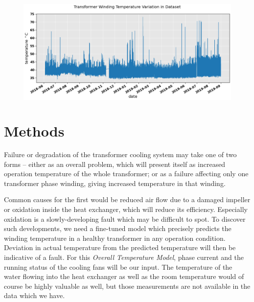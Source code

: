 \documentclass[]{article}
\begin{document}
\begin{figure}[!h]
	\centering
	\includegraphics[width=1\linewidth]{./figs/winding-temp-all-dataset.png}
	\caption{}
	\label{fig:winding-temp-all-dataset}
\end{figure}



\section{Methods} \label{sec:methods}

Failure or degradation of the transformer cooling system may take one of two forms -- either as an overall problem, which will present itself as increased operation temperature of the whole transformer; or as a failure affecting only one transformer phase winding, giving increased temperature in that winding. 

Common causes for the first would be reduced air flow due to a damaged impeller or oxidation inside the heat exchanger, which will reduce its efficiency. Especially oxidation is a slowly-developing fault which may be difficult to spot. To discover such developments, we need a fine-tuned model which precisely predicts the winding temperature in a healthy transformer in any operation condition. Deviation in actual temperature from the predicted temperature will then be indicative of a fault. For this \textit{Overall Temperature Model}, phase current and the running status of the cooling fans will be our input. The temperature of the water flowing into the heat exchanger as well as the room temperature would of course be highly valuable as well, but those measurements are not available in the data which we have.
\end{document}
